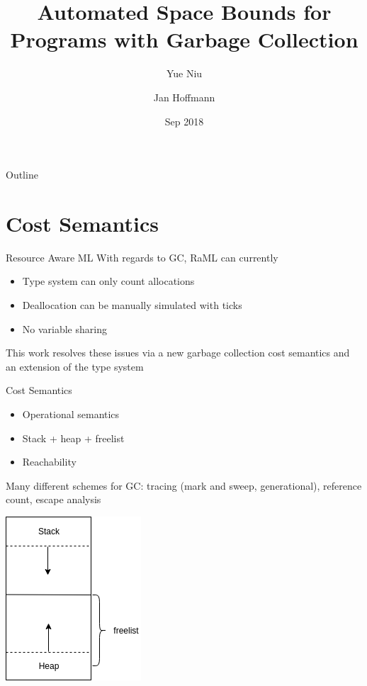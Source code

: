 \documentclass{beamer}
\title{Automated Space Bounds for Programs with Garbage Collection}
\subtitle{}
\author{Yue Niu \and Jan Hoffmann}
\institute[Carnegie Mellon University] %
{
  Department of Computer Science\\
	Carnegie Mellon University
}
\date{Sep 2018}
\theoremstyle{definition}
\begin{document}
\begin{frame}
  \titlepage
\end{frame}

\begin{frame}{Outline}
  \tableofcontents
\end{frame}

\section{Cost Semantics}

\begin{frame}{Resource Aware ML}
  With regards to GC, RaML can currently
  \begin{itemize}
  \item Type system can only count allocations
  \item Deallocation can be manually simulated with ticks
  \item No variable sharing
  \end{itemize}
  This work resolves these issues via a new garbage collection cost semantics
  and an extension of the type system
  
\end{frame}

\begin{frame}{Cost Semantics}
  \begin{itemize}
  \item Operational semantics
  \item Stack + heap + freelist
  \item Reachability
  \end{itemize}
  Many different schemes for GC: tracing (mark and sweep, generational), reference count, escape
  analysis
    \begin{center}
      \includegraphics[scale=0.5]{memory}
    \end{center}
\end{frame}
\end{document}
